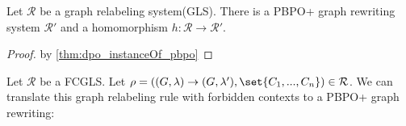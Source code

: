 


\begin{corollary}
    Let $\mathcal{R}$ be a graph relabeling system(GLS). There is a PBPO+ graph rewriting system $\mathcal{R}'$ and a homomorphism $h: \mathcal{R}\to \mathcal{R}'$.
\end{corollary}
\begin{proof}
    by \autoref{thm:dpo_instanceOf_pbpo}
\end{proof}

Let $\mathcal{R}$ be a FCGLS. Let $\rho = ((G,\lambda) \to (G,\lambda'), \set{C_1,...,C_n}) \in \mathcal{R}$. We can translate this graph relabeling rule with forbidden contexts to a PBPO+ graph rewriting:

